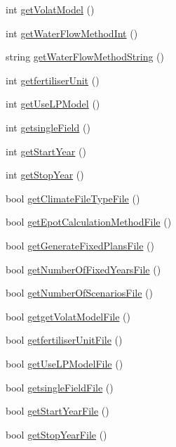 \begin{DoxyCompactItemize}
\item 
int \hyperlink{classsystem_data_aa70ac4b1a57b814784a997558adc5ae3}{getVolatModel} ()
\item 
int \hyperlink{classsystem_data_ad87b436a2ebae19b58328f582f6ca9ee}{getWaterFlowMethodInt} ()
\item 
string \hyperlink{classsystem_data_ac60e429cd9c7a49e2a1c57c9e9d9e412}{getWaterFlowMethodString} ()
\item 
int \hyperlink{classsystem_data_a16a5fcd269d0eb26de1dd6e0268b74fa}{getfertiliserUnit} ()
\item 
int \hyperlink{classsystem_data_a3f77c7fdf17b8a3f95dafb4a76ac7fc6}{getUseLPModel} ()
\item 
int \hyperlink{classsystem_data_a27dca630b90f58940e8afcbec07fb695}{getsingleField} ()
\item 
int \hyperlink{classsystem_data_a59732f396d1ad499b1cd9c83536f0c69}{getStartYear} ()
\item 
int \hyperlink{classsystem_data_a6f75283684de4cf73e5d39cf661ddeab}{getStopYear} ()
\item 
bool \hyperlink{classsystem_data_a4372f16e43949146b759fa192f7bf684}{getClimateFileTypeFile} ()
\item 
bool \hyperlink{classsystem_data_a6a498a7268b0735747f898253eb84876}{getEpotCalculationMethodFile} ()
\item 
bool \hyperlink{classsystem_data_ad10174ce6da425b146b0f567c7473633}{getGenerateFixedPlansFile} ()
\item 
bool \hyperlink{classsystem_data_ab81d2c11170cafb4f46c5dfd47537efa}{getNumberOfFixedYearsFile} ()
\item 
bool \hyperlink{classsystem_data_ac5e5b9e430416b9cc71dc54eee7b1a1e}{getNumberOfScenariosFile} ()
\item 
bool \hyperlink{classsystem_data_a522ff10c74edfc24d3d78bfc9163ae93}{getgetVolatModelFile} ()
\item 
bool \hyperlink{classsystem_data_a9796ba965819b310dd25e2212ce7abfb}{getfertiliserUnitFile} ()
\item 
bool \hyperlink{classsystem_data_a02aacf770e711a990c1ce054bee0b2ab}{getUseLPModelFile} ()
\item 
bool \hyperlink{classsystem_data_aeeec31a50796cb84385170b29ade6e7d}{getsingleFieldFile} ()
\item 
bool \hyperlink{classsystem_data_a22ea2d6e74cd98f720274b65766117bf}{getStartYearFile} ()
\item 
bool \hyperlink{classsystem_data_a665769b34a23a1c78846a4c730cfaa90}{getStopYearFile} ()

\end{DoxyCompactItemize}
